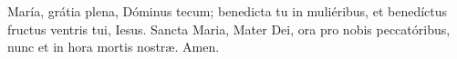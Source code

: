  María, grátia plena, Dóminus tecum; benedicta tu in muliéribus, et benedíctus fructus ventris tui,
Iesus. Sancta Maria, Mater Dei, ora pro nobis peccatóribus, nunc et in hora mortis nostr{\ae}. Amen.